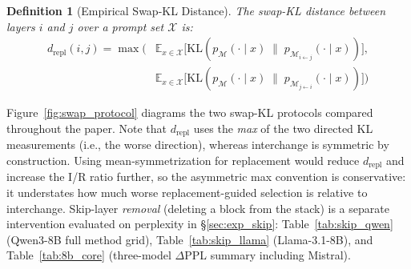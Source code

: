 \documentclass{article}
\newenvironment{fighere}{%
  \par\medskip
  \begin{center}
}{%
  \end{center}
  \medskip
}
\newtheorem{definition}{Definition}
\begin{document}
\begin{definition}[Empirical Swap-KL Distance]
\label{def:swap_kl}
The swap-KL distance between layers $i$ and $j$ over a prompt set $\mathcal{X}$ is:
\begin{align}
    d_{\text{repl}}(i, j) = \max\Big(&\mathbb{E}_{x \in \mathcal{X}}\!\big[\text{KL}\!\left(p_\mathcal{M}(\cdot \mid x) \;\|\; p_{\mathcal{M}_{i \leftarrow j}}(\cdot \mid x)\right)\big],\nonumber\\
    &\mathbb{E}_{x \in \mathcal{X}}\!\big[\text{KL}\!\left(p_\mathcal{M}(\cdot \mid x) \;\|\; p_{\mathcal{M}_{j \leftarrow i}}(\cdot \mid x)\right)\big]\Big)
\end{align}
\end{definition}

Figure~\ref{fig:swap_protocol} diagrams the two swap-KL protocols compared throughout the paper. Note that $d_{\text{repl}}$ uses the \emph{max} of the two directed KL measurements (i.e., the worse direction), whereas interchange is symmetric by construction. Using mean-symmetrization for replacement would reduce $d_{\text{repl}}$ and increase the I/R ratio further, so the asymmetric max convention is conservative: it understates how much worse replacement-guided selection is relative to interchange. Skip-layer \emph{removal} (deleting a block from the stack) is a separate intervention evaluated on perplexity in \S\ref{sec:exp_skip}: Table~\ref{tab:skip_qwen} (Qwen3-8B full method grid), Table~\ref{tab:skip_llama} (Llama-3.1-8B), and Table~\ref{tab:8b_core} (three-model $\Delta$PPL summary including Mistral).

\begin{fighere}
\resizebox{\textwidth}{!}{}
\label{fig:swap_protocol}
\end{fighere}
\end{document}
